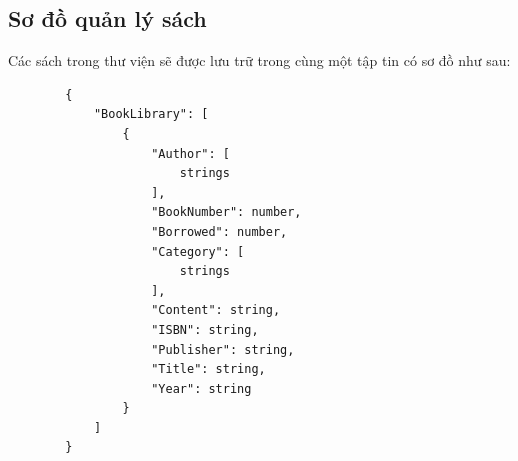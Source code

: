 \documentclass[12pt,a4paper]{report}
\begin{document}
        \subsection{Sơ đồ quản lý sách}
        Các sách trong thư viện sẽ được lưu trữ trong cùng một tập tin có sơ đồ như sau:
%
        \begin{verbatim}
        {
            "BookLibrary": [
                {
                    "Author": [
                        strings
                    ],
                    "BookNumber": number,
                    "Borrowed": number,
                    "Category": [
                        strings
                    ],
                    "Content": string,
                    "ISBN": string,
                    "Publisher": string,
                    "Title": string,
                    "Year": string
                }
            ]
        }
        \end{verbatim}
        \newpage
\end{document}
